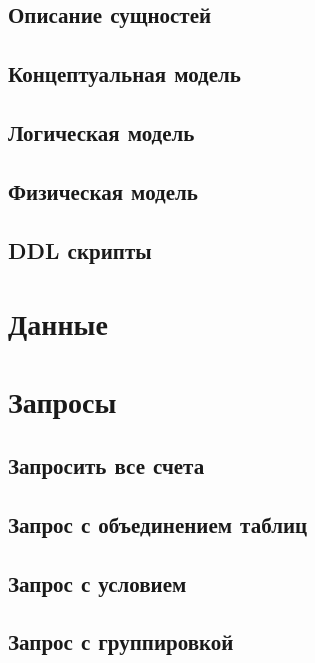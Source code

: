 \documentclass[a4paper]{article}
\begin{document}
\subsection{Описание сущностей}

\subsection{Концептуальная модель}

\subsection{Логическая модель}

\subsection{Физическая модель}

\subsection{DDL скрипты}

\section{Данные}

\section{Запросы}


\subsection{Запросить все счета}

\subsection{Запрос с объединением таблиц}

\subsection{Запрос с условием}

\subsection{Запрос с группировкой}
\end{document}
